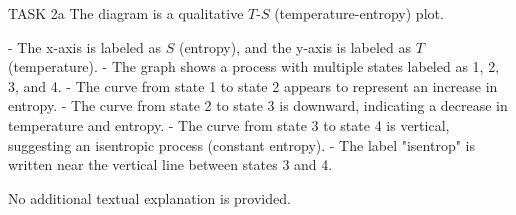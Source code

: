 TASK 2a  
The diagram is a qualitative \( T \)-\( S \) (temperature-entropy) plot.  

- The x-axis is labeled as \( S \) (entropy), and the y-axis is labeled as \( T \) (temperature).  
- The graph shows a process with multiple states labeled as 1, 2, 3, and 4.  
- The curve from state 1 to state 2 appears to represent an increase in entropy.  
- The curve from state 2 to state 3 is downward, indicating a decrease in temperature and entropy.  
- The curve from state 3 to state 4 is vertical, suggesting an isentropic process (constant entropy).  
- The label "isentrop" is written near the vertical line between states 3 and 4.  

No additional textual explanation is provided.